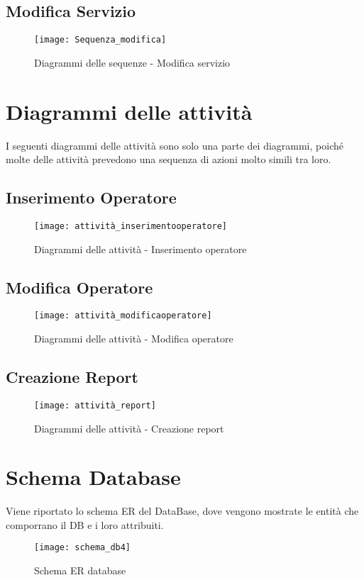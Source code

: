 \documentclass[green, fancy, 11pt]{elegantbook}
\begin{document}
\subsection{Modifica Servizio}
\begin{figure}[H]
	\centering
	\texttt{[image: Sequenza\_modifica]}
	\caption{Diagrammi delle sequenze - Modifica servizio}
\end{figure}
\newpage

\section{Diagrammi delle attività}
  I seguenti diagrammi delle attività sono solo una parte dei diagrammi, poiché molte delle attività prevedono una sequenza di azioni molto simili tra loro.
{\center
\subsection{Inserimento Operatore}
\begin{figure}[H]
	\centering
	\texttt{[image: attività\_inserimentooperatore]}
	\caption{Diagrammi delle attività - Inserimento operatore}
\end{figure}
\newpage
\subsection{Modifica Operatore}
\begin{figure}[H]
	\centering
	\texttt{[image: attività\_modificaoperatore]}
	\caption{Diagrammi delle attività - Modifica operatore}
\end{figure}
\newpage
\subsection{Creazione Report}
\begin{figure}[H]
	\centering
	\texttt{[image: attività\_report]}
	\caption{Diagrammi delle attività - Creazione report}
\end{figure}
\newpage
}

\section{Schema Database}
Viene riportato lo schema ER del DataBase, dove vengono mostrate le entità che comporrano il DB e i loro attribuiti.
\begin{figure}[H]
	\centering
	\texttt{[image: schema\_db4]}
	\caption{Schema ER database}
\end{figure}
\end{document}
